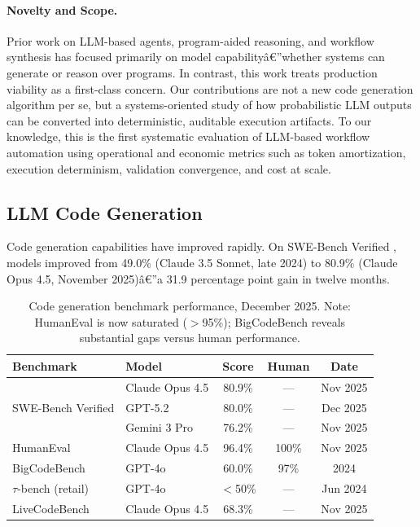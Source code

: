 \documentclass[11pt]{article}
\begin{document}
\paragraph{Novelty and Scope.}
Prior work on LLM-based agents, program-aided reasoning, and workflow synthesis has focused primarily on model capabilityâ€”whether systems can generate or reason over programs. In contrast, this work treats production viability as a first-class concern. Our contributions are not a new code generation algorithm per se, but a systems-oriented study of how probabilistic LLM outputs can be converted into deterministic, auditable execution artifacts. To our knowledge, this is the first systematic evaluation of LLM-based workflow automation using operational and economic metrics such as token amortization, execution determinism, validation convergence, and cost at scale.

\subsection{LLM Code Generation}

Code generation capabilities have improved rapidly. On SWE-Bench Verified \citep{jimenez2024swebench}, models improved from 49.0\% (Claude 3.5 Sonnet, late 2024) to 80.9\% (Claude Opus 4.5, November 2025)â€”a 31.9 percentage point gain in twelve months.

\begin{table}[ht]
\centering
\caption{Code generation benchmark performance, December 2025. Note: HumanEval is now saturated ($>$95\%); BigCodeBench reveals substantial gaps versus human performance.}
\label{tab:benchmarks}
\begin{tabular}{llccc}
\toprule
Benchmark & Model & Score & Human & Date \\
\midrule
\multirow{3}{*}{SWE-Bench Verified} & Claude Opus 4.5 & 80.9\% & --- & Nov 2025 \\
 & GPT-5.2 & 80.0\% & --- & Dec 2025 \\
 & Gemini 3 Pro & 76.2\% & --- & Nov 2025 \\
\midrule
HumanEval & Claude Opus 4.5 & 96.4\% & 100\% & Nov 2025 \\
\midrule
BigCodeBench \citep{zhuo2024bigcodebench} & GPT-4o & 60.0\% & 97\% & 2024 \\
\midrule
$\tau$-bench (retail) \citep{yao2024taubench} & GPT-4o & $<$50\% & --- & Jun 2024 \\
\midrule
LiveCodeBench & Claude Opus 4.5 & 68.3\% & --- & Nov 2025 \\
\bottomrule
\end{tabular}
\end{table}
\end{document}
